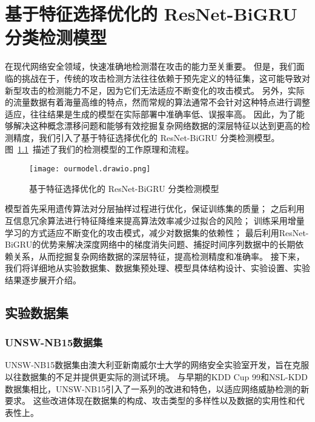 \chapter{基于特征选择优化的 ResNet-BiGRU 分类检测模型}
\label{cha:ResNet-BiGRU}

在现代网络安全领域，快速准确地检测潜在攻击的能力至关重要。
但是，我们面临的挑战在于，传统的攻击检测方法往往依赖于预先定义的特征集，这可能导致对新型攻击的检测能力不足，因为它们无法适应不断变化的攻击模式。
另外，实际的流量数据有着海量高维的特点，然而常规的算法通常不会针对这种特点进行调整适应，往往结果是生成的模型在实际部署中准确率低、误报率高。
因此，为了能够解决这种概念漂移问题和能够有效挖掘复杂网络数据的深层特征以达到更高的检测精度，我们引入了基于特征选择优化的 ResNet-BiGRU 分类检测模型。
图~\ref{fig:attack_detecion_model}~描述了我们的检测模型的工作原理和流程。
\begin{figure}[htbp]
  \centering
  \texttt{[image: ourmodel.drawio.png]}
  \caption{基于特征选择优化的 ResNet-BiGRU 分类检测模型}
  \label{fig:attack_detecion_model}
\end{figure}


模型首先采用遗传算法对分层抽样过程进行优化，保证训练集的质量；
之后利用互信息冗余算法进行特征降维来提高算法效率减少过拟合的风险；
训练采用增量学习的方式适应不断变化的攻击模式，减少对数据集的依赖性；
最后利用ResNet-BiGRU的优势来解决深度网络中的梯度消失问题、捕捉时间序列数据中的长期依赖关系，从而挖掘复杂网络数据的深层特征，提高检测精度和准确率。
接下来，我们将详细地从实验数据集、数据集预处理、模型具体结构设计、实验设置、实验结果逐步展开介绍。

\section{实验数据集}
\subsection{UNSW-NB15数据集\cite{moustafa2015comprehensive}}
UNSW-NB15数据集由澳大利亚新南威尔士大学的网络安全实验室开发，旨在克服以往数据集的不足并提供更实际的测试环境。
与早期的KDD Cup 99和NSL-KDD数据集相比，UNSW-NB15引入了一系列的改进和特色，以适应网络威胁检测的新要求。
这些改进体现在数据集的构成、攻击类型的多样性以及数据的实用性和代表性上。

